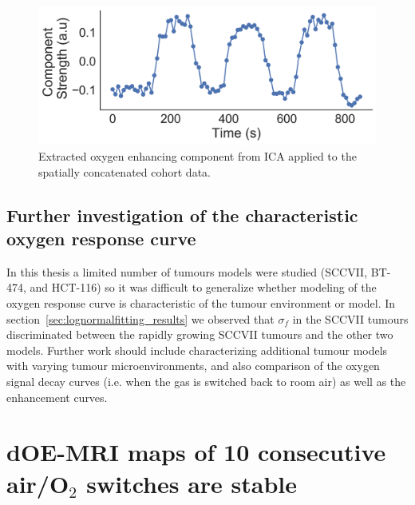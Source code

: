 \begin{figure}[htbp]
   \centering
   \includegraphics[width=\textwidth]{futurework/futurework-images/ISMRM2019_AARTS3_groupICA_OEcomponent.png} %
   \caption{Extracted oxygen enhancing component from \acs{ICA} applied to the spatially concatenated cohort data.
   \label{groupICA1}}
\end{figure}

\subsection{Further investigation of the characteristic oxygen response curve}

In this thesis a limited number of tumours models were studied (SCCVII, BT-474, and HCT-116) so it was difficult to generalize whether modeling of the oxygen response curve is characteristic of the tumour environment or model. 
In section~\ref{sec:lognormalfitting_results} we observed that $\sigma_f$ in the SCCVII tumours discriminated between the rapidly growing SCCVII tumours and the other two models.
Further work should include characterizing additional tumour models with varying tumour microenvironments, and also comparison of the oxygen signal decay curves (i.e. when the gas is switched back to room air) as well as the enhancement curves.

\section{dOE-MRI maps of 10 consecutive air/\texorpdfstring{O$_2$}{O2} switches are stable}

